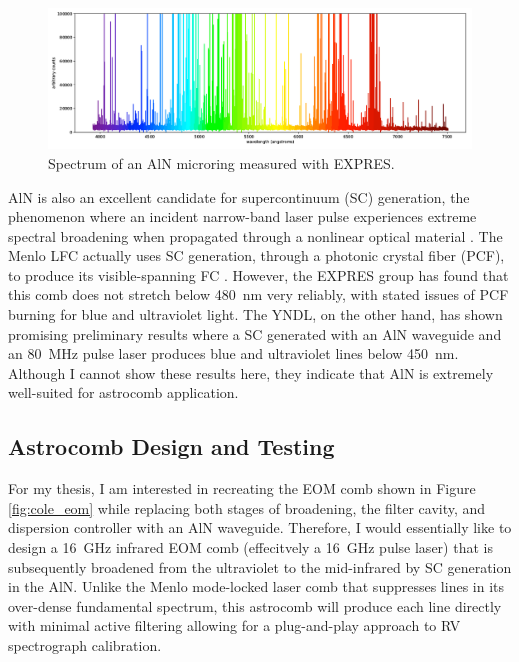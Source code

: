 \documentclass[11pt]{article}
\begin{document}
\begin{figure}
    \centering
    \includegraphics[width=\textwidth]{images/aln_spectrum.png}
    \caption{Spectrum of an AlN microring measured with EXPRES.}
    \label{fig:aln_spectrum}
\end{figure}

AlN is also an excellent candidate for supercontinuum (SC) generation, the phenomenon where an incident narrow-band laser pulse experiences extreme spectral broadening when propagated through a nonlinear optical material \citep{Dudley2006}. The Menlo LFC actually uses SC generation, through a photonic crystal fiber (PCF), to produce its visible-spanning FC \citep{Probst2014}. However, the EXPRES group has found that this comb does not stretch below \SI{480}{\nano\meter} very reliably, with stated issues of PCF burning for blue and ultraviolet light. The YNDL, on the other hand, has shown promising preliminary results where a SC generated with an AlN waveguide and an \SI{80}{\mega\hertz} pulse laser produces blue and ultraviolet lines below \SI{450}{\nano\meter}. Although I cannot show these results here, they indicate that AlN is extremely well-suited for astrocomb application.

\subsection{Astrocomb Design and Testing}
\label{subsec:comb_design}

For my thesis, I am interested in recreating the EOM comb shown in Figure \ref{fig:cole_eom} while replacing both stages of broadening, the filter cavity, and dispersion controller with an AlN waveguide. Therefore, I would essentially like to design a \SI{16}{\giga\hertz} infrared EOM comb (effecitvely a \SI{16}{\giga\hertz} pulse laser) that is subsequently broadened from the ultraviolet to the mid-infrared by SC generation in the AlN. Unlike the Menlo mode-locked laser comb that suppresses lines in its over-dense fundamental spectrum, this astrocomb will produce each line directly with minimal active filtering allowing for a plug-and-play approach to RV spectrograph calibration.
\end{document}
